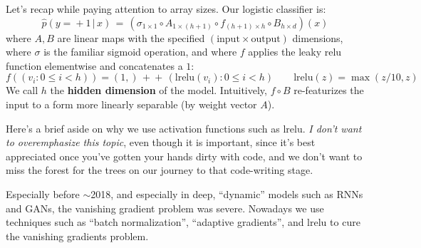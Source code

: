 Let's recap while paying attention to array sizes.
Our logistic classifier is:
$$
  \hat p(y\!=\!+1\,|\,x) \,=\,
  (\sigma_{1\times 1} \circ
  A_{1\times (h+1)} \circ
  f_{(h+1)\times h} \circ
  B_{h\times d})(x)
$$
where $A,B$ are linear maps with the specified
$(\text{input}\times\text{output})$ dimensions, where $\sigma$ is the
familiar sigmoid operation, and where $f$ applies the leaky relu
function elementwise and concatenates a $1$:
$$
  f((v_i : 0\leq i<h)) = (1,)\,+\!\!\!\!+\,(\text{lrelu}(v_i) : 0\leq i<h)
  \quad \quad
  \text{lrelu}(z) = \max(z/10, z)
$$
We call $h$ the \textbf{hidden dimension} of the model.
%
Intuitively, $f \circ B$ re-featurizes the input to a form more
linearly separable (by weight vector $A$).


Here's a brief aside on why we use activation functions such as $\text{lrelu}$.
\emph{I don't want to overemphasize this topic}, even though it is important, since it's best
appreciated once you've gotten your hands dirty with code, and we don't want to
miss the forest for the trees on our journey to that code-writing stage.
%
%

Especially
before $\sim$2018, and especially in deep, ``dynamic'' models such as RNNs and GANs,
the vanishing gradient problem was severe.
Nowadays we use techniques such as
``batch normalization'', ``adaptive gradients'', and $\text{lrelu}$ to cure the
vanishing gradients problem.

